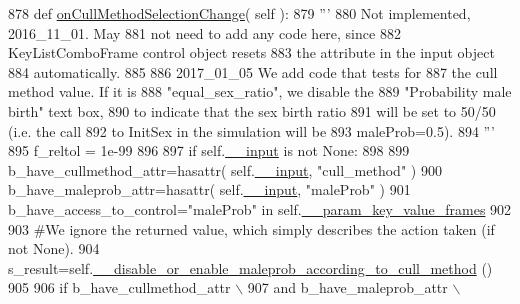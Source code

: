 \begin{DoxyCode}
878     \textcolor{keyword}{def }\hyperlink{classnegui_1_1pgguisimupop_1_1PGGuiSimuPop_ad1d590f23bbaf0eda730d488ea74c1ba}{onCullMethodSelectionChange}( self ):
879         \textcolor{stringliteral}{'''}
880 \textcolor{stringliteral}{        Not implemented, 2016\_11\_01.  May}
881 \textcolor{stringliteral}{        not need to add any code here, since}
882 \textcolor{stringliteral}{        KeyListComboFrame control object resets}
883 \textcolor{stringliteral}{        the attribute in the input object}
884 \textcolor{stringliteral}{        automatically.}
885 \textcolor{stringliteral}{}
886 \textcolor{stringliteral}{        2017\_01\_05  We add code that tests for}
887 \textcolor{stringliteral}{        the cull method value.  If it is }
888 \textcolor{stringliteral}{        "equal\_sex\_ratio", we disable the}
889 \textcolor{stringliteral}{        "Probability male birth" text box,}
890 \textcolor{stringliteral}{        to indicate that the sex birth ratio}
891 \textcolor{stringliteral}{        will be set to 50/50 (i.e. the call}
892 \textcolor{stringliteral}{        to InitSex in the simulation will be}
893 \textcolor{stringliteral}{        maleProb=0.5).}
894 \textcolor{stringliteral}{        '''}
895         f\_reltol = 1e-99    
896 
897         \textcolor{keywordflow}{if} self.\hyperlink{classnegui_1_1pgguisimupop_1_1PGGuiSimuPop_a0b9f7d933b428393d34105828600a007}{\_\_input} \textcolor{keywordflow}{is} \textcolor{keywordflow}{not} \textcolor{keywordtype}{None}:
898 
899             b\_have\_cullmethod\_attr=hasattr( self.\hyperlink{classnegui_1_1pgguisimupop_1_1PGGuiSimuPop_a0b9f7d933b428393d34105828600a007}{\_\_input}, \textcolor{stringliteral}{"cull\_method"} )
900             b\_have\_maleprob\_attr=hasattr(  self.\hyperlink{classnegui_1_1pgguisimupop_1_1PGGuiSimuPop_a0b9f7d933b428393d34105828600a007}{\_\_input}, \textcolor{stringliteral}{"maleProb"} )
901             b\_have\_access\_to\_control=\textcolor{stringliteral}{"maleProb"} \textcolor{keywordflow}{in} self.\hyperlink{classnegui_1_1pgguisimupop_1_1PGGuiSimuPop_a272523ce4bad4d1073c506e858c59996}{\_\_param\_key\_value\_frames}
902 
903             \textcolor{comment}{#We ignore the returned value, which simply describes the action taken (if not None).}
904             s\_result=self.\hyperlink{classnegui_1_1pgguisimupop_1_1PGGuiSimuPop_a6a5e11f2c1721d804722bdc6072eae64}{\_\_disable\_or\_enable\_maleprob\_according\_to\_cull\_method}
      ()
905 
906             \textcolor{keywordflow}{if} b\_have\_cullmethod\_attr  \(\backslash\)
907                             \textcolor{keywordflow}{and} b\_have\_maleprob\_attr \(\backslash\)

\end{DoxyCode}
